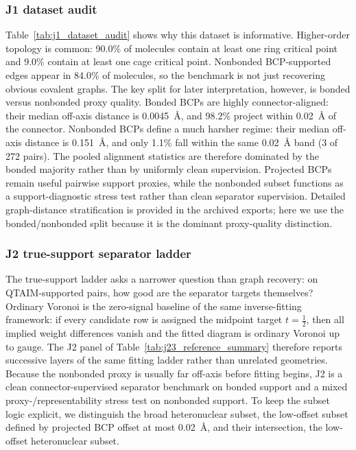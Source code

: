 \documentclass[preprint,12pt]{elsarticle}
\begin{document}
\subsubsection{J1 dataset audit}
Table~\ref{tab:j1_dataset_audit} shows why this dataset is informative.
Higher-order topology is common: 90.0\% of molecules contain at least one ring
critical point and 9.0\% contain at least one cage critical point. Nonbonded
BCP-supported edges appear in 84.0\% of molecules, so the benchmark is not
just recovering obvious covalent graphs. The key split for later
interpretation, however, is bonded versus nonbonded proxy quality. Bonded BCPs
are highly connector-aligned: their median off-axis distance is 0.0045~\AA{},
and 98.2\% project within 0.02~\AA{} of the connector. Nonbonded BCPs define a
much harsher regime: their median off-axis distance is 0.151~\AA{}, and only
1.1\% fall within the same 0.02~\AA{} band (3 of 272 pairs). The pooled
alignment statistics are therefore dominated by the bonded majority rather than
by uniformly clean supervision. Projected BCPs remain useful pairwise support
proxies, while the nonbonded subset functions as a support-diagnostic stress
test rather than clean separator supervision. Detailed graph-distance
stratification is provided in the archived exports; here we use the
bonded/nonbonded split because it is the dominant proxy-quality distinction.





\subsubsection{J2 true-support separator ladder}
The true-support ladder asks a narrower question than graph recovery: on
QTAIM-supported pairs, how good are the separator targets themselves? Ordinary
Voronoi is the zero-signal baseline of the same inverse-fitting framework: if
every candidate row is assigned the midpoint target $t=\frac12$, then all
implied weight differences vanish and the fitted diagram is ordinary Voronoi up
to gauge. The J2 panel of Table~\ref{tab:j23_reference_summary} therefore
reports successive layers of the same fitting ladder rather than unrelated
geometries. Because the nonbonded proxy is usually far off-axis before fitting
begins, J2 is a clean connector-supervised separator benchmark on bonded
support and a mixed proxy-/representability stress test on nonbonded support.
To keep the subset logic explicit, we distinguish the broad heteronuclear
subset, the low-offset subset defined by projected BCP offset at most
0.02~\AA{}, and their intersection, the low-offset heteronuclear subset.
\end{document}
